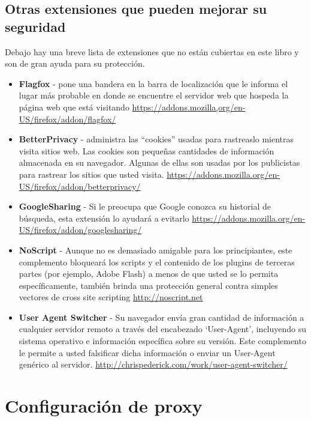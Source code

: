 \documentclass[10pt,a5paper,twoside,,]{book}
\begin{document}
\section{Otras extensiones que pueden mejorar su
seguridad}\label{otras-extensiones-que-pueden-mejorar-su-seguridad}

Debajo hay una breve lista de extensiones que no están cubiertas en este
libro y son de gran ayuda para su protección.

\begin{itemize}
\item
  \textbf{Flagfox} - pone una bandera en la barra de localización que le
  informa el lugar más probable en donde se encuentre el servidor web
  que hospeda la página web que está visitando
  \href{https://addons.mozilla.org/en-US/firefox/addon/flagfox/}{https://addons.mozilla,org/en-US/firefox/addon/flagfox/}
\item
  \textbf{BetterPrivacy} - administra las ``cookies'' usadas para
  rastreaslo mientras visita sitios web. Las cookies son pequeñas
  cantidades de información almacenada en su navegador. Algunas de ellas
  son usadas por los publicistas para rastrear los sitios que usted
  visita.
  \url{https://addons.mozilla.org/en-US/firefox/addon/betterprivacy/}
\item
  \textbf{GoogleSharing} - Si le preocupa que Google conozca su
  historial de búsqueda, esta extensión lo ayudará a evitarlo
  \href{https://addons.mozilla.org/en-us/firefox/addon/googlesharing/}{https://addons.mozilla.org/en-US/firefox/addon/googlesharing/}
\item
  \textbf{NoScript} - Aunque no es demasiado amigable para los
  principiantes, este complemento bloqueará los scripts y el contenido
  de los plugins de terceras partes (por ejemplo, Adobe Flash) a menos
  de que usted se lo permita específicamente, también brinda una
  protección general contra simples vectores de cross site scripting
  \url{http://noscript.net}
\item
  \textbf{User Agent Switcher} - Su navegador envía gran cantidad de
  información a cualquier servidor remoto a través del encabezado
  `User-Agent', incluyendo su sistema operativo e información específica
  sobre su versión. Este complemento le permite a usted falsificar dicha
  información o enviar un User-Agent genérico al servidor.
  \url{http://chrispederick.com/work/user-agent-switcher/}
\end{itemize}

\chapter{Configuración de proxy}\label{configuraciuxf3n-de-proxy}
\end{document}
